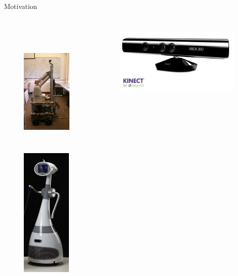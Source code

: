\documentclass{beamer}
\begin{document}
\begin{frame}{Motivation}
	\begin{columns}
		\begin{figure}
		\includegraphics[width=0.45\linewidth,height=2.5in]{robot2.jpg}
		\hskip0.1in
		\includegraphics[width=0.45\linewidth,height=2.5in]{luna.png}
		\end{figure}
		\begin{figure}
		\hskip-0.1in
		\includegraphics[width=0.9\linewidth]{kinect.jpg}\\
		\hskip-0.2in

\end{figure}
\end{columns}
\end{frame}
\end{document}
